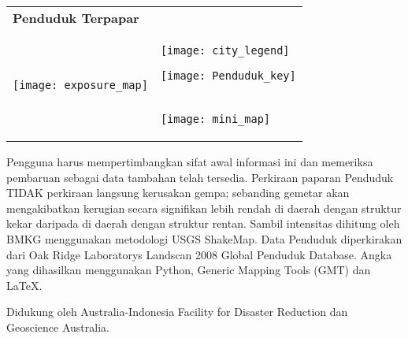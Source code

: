 \documentclass[a4paper]{article}
\begin{document}


\bigskip


\bigskip
\hspace{-6mm} 

\bigskip
\begin{tabular}{@{}l@{}l}
  \Large \textbf{Penduduk Terpapar} & \\
  \parbox[t]{0.7\textwidth}{
    \vspace{0pt}
    \texttt{[image: exposure\_map]}} &
  \hspace{-10mm}
  \parbox[t]{0.3\textwidth}{
    \vspace{2mm}
    \texttt{[image: city\_legend]} \\[2mm]
    \centerline{
      \texttt{[image: Penduduk\_key]}}\\[2mm]
    \texttt{[image: mini\_map]}\\
  }
\end{tabular}

\bigskip
\bigskip
\bigskip

\parbox[t]{0.95\textwidth}{\scriptsize
Pengguna harus mempertimbangkan sifat awal informasi ini dan memeriksa pembaruan sebagai data tambahan telah tersedia. Perkiraan paparan Penduduk TIDAK perkiraan langsung kerusakan gempa; sebanding gemetar akan mengakibatkan kerugian secara signifikan lebih rendah di daerah dengan struktur kekar daripada di daerah dengan struktur rentan. Sambil intensitas dihitung oleh BMKG menggunakan metodologi USGS ShakeMap. Data Penduduk diperkirakan dari Oak Ridge Laboratorys Landscan 2008 Global Penduduk Database. Angka yang dihasilkan menggunakan Python, Generic Mapping Tools (GMT) dan \LaTeX.

Didukung oleh Australia-Indonesia Facility for Disaster Reduction dan Geoscience Australia.}
\end{document}
